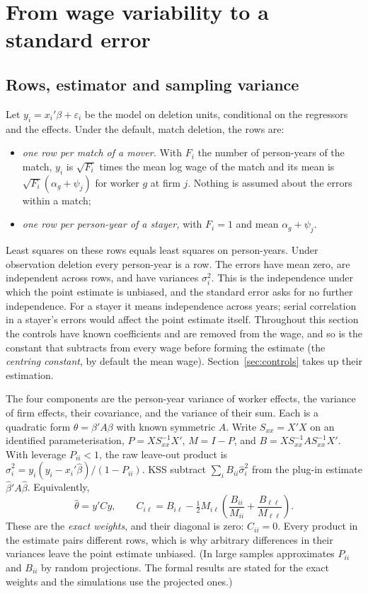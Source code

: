 \section{From wage variability to a standard error}\label{sec:estimator}

\subsection{Rows, estimator and sampling variance}
Let $y_i=x_i'\beta+\varepsilon_i$ be the model on deletion units, conditional on the
regressors and the effects. Under the default, match deletion, the rows are:
\begin{itemize}
\item \emph{one row per match of a mover.} With $F_i$ the number of person-years of the
match, $y_i$ is $\sqrt{F_i}$ times the mean log wage of the match and its mean is
$\sqrt{F_i}(\alpha_g+\psi_j)$ for worker $g$ at firm $j$. Nothing is assumed about the
errors within a match;
\item \emph{one row per person-year of a stayer,} with $F_i=1$ and mean
$\alpha_g+\psi_j$.
\end{itemize}
Least squares on these rows equals least squares on person-years. Under observation
deletion every person-year is a row. The errors have mean zero, are independent across
rows, and have variances $\sigma_i^2$. This is the independence under which the point
estimate is unbiased, and the standard error asks for no further independence. For a
stayer it means independence across years; serial correlation in a stayer's errors
would affect the point estimate itself. Throughout this section
the controls have known coefficients and are removed from the wage, and so is the
constant that \fevc{} subtracts from every wage before forming the estimate (the
\emph{centring constant}, by default the mean wage). Section~\ref{sec:controls} takes
up their estimation.

The four components are the person-year variance of worker effects, the variance
of firm effects, their covariance, and the variance of their sum. Each is a
quadratic form $\theta=\beta'A\beta$ with known symmetric $A$. Write
$S_{xx}=X'X$ on an identified parameterisation, $P=XS_{xx}^{-1}X'$,
$M=I-P$, and $B=XS_{xx}^{-1}AS_{xx}^{-1}X'$. With leverage $P_{ii}<1$,
the raw leave-out product is $\hat\sigma_i^2=y_i(y_i-x_i'\hat\beta)/(1-P_{ii})$.
KSS subtract $\sum_i B_{ii}\hat\sigma_i^2$ from the plug-in estimate
$\hat\beta'A\hat\beta$. Equivalently,
\begin{equation}\label{eq:ustat}
 \hat\theta=y'Cy,\qquad
 C_{i\ell}=B_{i\ell}-\tfrac12 M_{i\ell}
  \left(\frac{B_{ii}}{M_{ii}}+\frac{B_{\ell\ell}}{M_{\ell\ell}}\right).
\end{equation}
These are the \emph{exact weights}, and their diagonal is zero: $C_{ii}=0$. Every
product in the estimate pairs different rows, which is why arbitrary differences in
their variances leave the point estimate unbiased. (In large samples \fevc{}
approximates $P_{ii}$ and $B_{ii}$ by random projections. The formal results are
stated for the exact weights and the simulations use the projected ones.)

